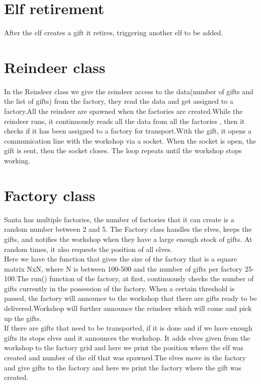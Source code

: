 \documentclass{article}
\begin{document}
\section{Elf retirement}
After the elf creates a gift it retires, triggering another elf to be added.

\section{Reindeer class}

In the Reindeer class we give the reindeer access to the data(number of gifts and the list of gifts) from the factory, they read the data and get assigned to a factory.All the reindeer are spawned when the factories are created.While the reindeer runs, it continuously reads all the data from all the factories , then it checks if it has been assigned to a factory for transport.With the gift, it opens a communication line with the workshop via a socket. When the socket is open, the gift is sent, then the socket closes.
The loop repeats until the workshop stops working.

\section{Factory class}

Santa has multiple factories, the number of factories that it can create is a random number between 2 and 5.
The Factory class handles the elves, keeps the gifts, and notifies the workshop when they have a large enough stock of gifts. At random times, it also requests the position of all elves.\\
Here we have the function that gives the size of the factory that is a square matrix NxN, where N is between 100-500 and the number of gifts per factory 25-100.The run() function of the factory, at first, continuously checks the number of gifts currently in the possession of the factory. When a certain threshold is passed, the factory will announce to the workshop that there are gifts ready to be delivered.Workshop will further announce the reindeer which will come and pick up the gifts.\\
If there are gifts that need to be transported, if it is done and if we have enough gifts its stops elves and it announces the workshop.
It adds elves given from the workshop to the factory grid and here we print the position where the elf was created and number of the elf that was spawned.The elves move in the factory and give gifts to the factory and here we print the factory where the gift was created.
\end{document}
